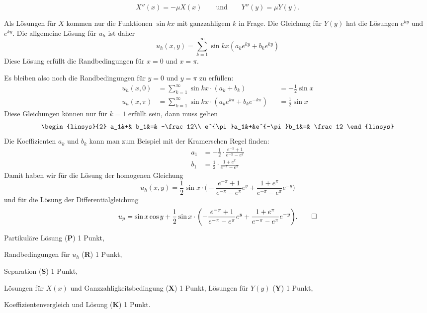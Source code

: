 \begin{loesung}
\begin{teilaufgaben}
\[
X''(x) = -\mu X(x)
\qquad\text{und}\qquad
Y''(y) = \mu Y(y).
\]
\item
Als Lösungen für $X$ kommen nur die Funktionen 
$\sin kx$ mit ganzzahligem $k$ in Frage.
Die Gleichung für $Y(y)$ hat die Lösungen $e^{ky}$ und $e^{ky}$.
Die allgemeine Lösung für $u_h$ ist daher
\[
u_h(x,y)
=
\sum_{k=1}^\infty \sin kx (a_k e^{ky} + b_k e^{ky})
\]
Diese Lösung erfüllt die Randbedingungen für $x=0$ und $x=\pi$.
\item
Es bleiben also noch die Randbedingungen für $y=0$ und $y=\pi$ zu erfüllen:
\begin{equation}
\begin{aligned}
u_h(x,0)   &= \sum_{k=1}^\infty \sin kx \cdot (a_k + b_k)&&=-\frac12\sin x
\\
u_h(x,\pi) &= \sum_{k=1}^\infty \sin kx \cdot (a_ke^{k\pi} + b_ke^{-k\pi}) &&=\frac12\sin x
\end{aligned}
\end{equation}
Diese Gleichungen können nur für $k=1$ erfüllt sein, dann muss gelten
\begin{equation}
\begin{linsys}{2}
       a_1&+&        b_1&=& -\frac12\\
e^{\pi}a_1&+&e^{-\pi}b_1&=&  \frac12
\end{linsys}
\end{equation}
Die Koeffizienten $a_k$ und $b_k$ kann man zum Beispiel mit der Kramerschen
Regel finden:
\begin{align*}
a_1
&=
-\frac12\cdot
\frac{e^{-\pi}+1}{e^{-\pi}-e^{\pi}}
\\
b_1
&=
\frac12\cdot
\frac{1+e^{\pi}}{e^{-\pi}-e^{\pi}}
\end{align*}
Damit haben wir für die Lösung der homogenen Gleichung
\[
u_h(x,y)
=
\frac12
\sin x \cdot \biggl(
-
\frac{e^{-\pi}+1}{e^{-\pi}-e^{\pi}} e^y
+
\frac{1+e^{\pi}}{e^{-\pi}-e^{\pi}} e^{-y}
\biggr)
\]
und für die Lösung der Differentialgleichung
\[
u_p
=
\sin x \cos y
+
\frac12
\sin x \cdot \biggl(
-
\frac{e^{-\pi}+1}{e^{-\pi}-e^{\pi}} e^y
+
\frac{1+e^{\pi}}{e^{-\pi}-e^{\pi}} e^{-y}
\biggr).
\qedhere
\]
\end{teilaufgaben}
\end{loesung}

\begin{bewertung}
\begin{teilaufgaben}
\item
Partikuläre Lösung ({\bf P}) 1 Punkt,
\item
Randbedingungen für $u_h$ ({\bf R}) 1 Punkt,
\item
Separation ({\bf S}) 1 Punkt,
\item
Lösungen für $X(x)$ und Ganzzahligkeitsbedingung ({\bf X}) 1 Punkt,
Lösungen für $Y(y)$ ({\bf Y}) 1 Punkt,
\item
Koeffizientenvergleich und Lösung ({\bf K}) 1 Punkt.
\end{teilaufgaben}
\end{bewertung}




